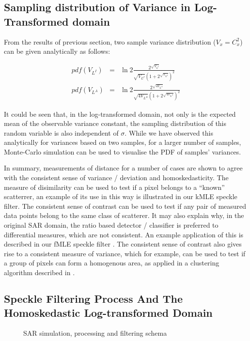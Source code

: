 \documentclass[journal]{IEEEtran}
\begin{document}
\subsection{Sampling distribution of Variance in Log-Transformed domain}

From the results of previous section, two sample variance distribution ($V_x = C_x^2$) can be given analytically as 
follows:

\begin{eqnarray}
pdf(V_{L^I}) &=& 
	\ln2 \frac{ 2^{\sqrt{V_{L^I}}}}{\sqrt{V_{L^I}} \left( 1+2^{\sqrt{V_{L^I}}} \right)^2} \\
pdf(V_{L^A}) &=&
	\ln2 \frac{2^{\sqrt{4V_{L^A}}}}{\sqrt{4V_{L^A}} \left( 1+2^{\sqrt{4V_{L^A}}} \right)^2} 
\end{eqnarray}

It could be seen that, in the log-transformed domain, not only is the expected mean of the observable variance 
constant, the sampling distribution of this random variable is also independent of $\sigma$. 
While we have observed this analytically for variances based on two samples, for a larger number of samples, 
Monte-Carlo simulation can be used to visualise the PDF of samples' variances. 

In summary, measurements of distance for a number of cases are shown to agree with the 
consistent sense of variance / deviation and homoskedasticity. The measure of disimilarity can be used to test 
if a pixel belongs to a ``known'' scatterrer, an example of its use in this way is illustrated in our kMLE speckle 
filter. The consistent sense of contrast can be used to test if any pair of measured data points belong to 
the same class of scatterer. It may also explain why, in the original SAR domain, the ratio based 
detector / classifier is preferred to differential measures, which are not consistent. 
An example application of this is described in our fMLE speckle filter \cite{Le_2011_ACRS}. The consistent sense 
of contrast also gives rise to a consistent measure of variance, which for example, can be used to test 
if a group of pixels can form a homogenous area, as applied in a clustering 
algorithm described in \cite{Le_2010_ACRS}.

\subsection{ Speckle Filtering Process And The Homoskedastic Log-transformed Domain}
\label{sec:schema_log_images}

\begin{figure}
 \centering
 \epsfxsize=2.4in
 \epsfysize=1.2in
\caption{SAR simulation, processing and filtering schema}
\label{fig:simul_process_filter_schema}
\end{figure}
\end{document}
